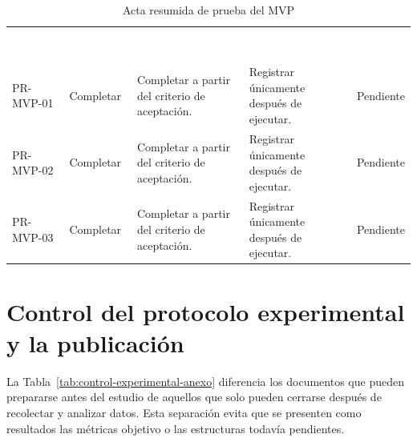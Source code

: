 \documentclass[12pt,a4paper]{article}
\begin{document}
\begin{table}[H]
\centering
\caption{Acta resumida de prueba del MVP}
\label{tab:acta-prueba-mvp}
\small
{}
\begin{tabularx}{\textwidth}{L{1.65cm} L{2.50cm} Y Y L{1.75cm}}
\textcolor{white}{\textbf{Prueba}} &
\textcolor{white}{\textbf{RF asociado}} &
\textcolor{white}{\textbf{Resultado esperado}} &
\textcolor{white}{\textbf{Resultado obtenido}} &
\textcolor{white}{\textbf{Estado}}\\
PR-MVP-01 & Completar & Completar a partir del criterio de aceptación. & Registrar únicamente después de ejecutar. & Pendiente\\
PR-MVP-02 & Completar & Completar a partir del criterio de aceptación. & Registrar únicamente después de ejecutar. & Pendiente\\
PR-MVP-03 & Completar & Completar a partir del criterio de aceptación. & Registrar únicamente después de ejecutar. & Pendiente\\
\end{tabularx}
\end{table}

\section{Control del protocolo experimental y la publicación}
\label{ap:control-experimento-publicacion}

La Tabla~\ref{tab:control-experimental-anexo} diferencia los documentos que pueden prepararse antes del estudio de aquellos que solo pueden cerrarse después de recolectar y analizar datos. Esta separación evita que se presenten como resultados las métricas objetivo o las estructuras todavía pendientes.
\end{document}
